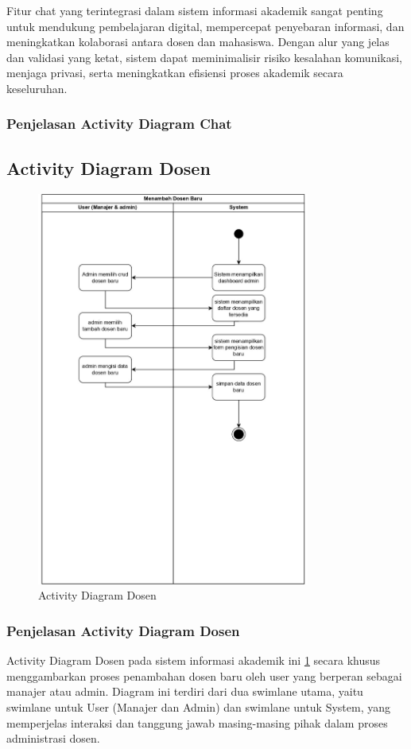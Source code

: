 \documentclass[a4paper,oneside,11pt]{book}
\begin{document}
Fitur chat yang terintegrasi dalam sistem informasi akademik sangat penting untuk mendukung pembelajaran digital, mempercepat penyebaran informasi, dan meningkatkan kolaborasi antara dosen dan mahasiswa. Dengan alur yang jelas dan validasi yang ketat, sistem dapat meminimalisir risiko kesalahan komunikasi, menjaga privasi, serta meningkatkan efisiensi proses akademik secara keseluruhan.

\subsubsection{Penjelasan Activity Diagram Chat}

\subsection{Activity Diagram Dosen}
\begin{figure}[H]
  \centering
  \includegraphics[width=0.8\textwidth]{Activity Diagram/Dosen.jpg}
  \caption{Activity Diagram Dosen}
  \label{fig:activity_dosen}
\end{figure}

\subsubsection{Penjelasan Activity Diagram Dosen}
Activity Diagram Dosen pada sistem informasi akademik ini \ref{fig:activity_dosen} secara khusus menggambarkan proses penambahan dosen baru oleh user yang berperan sebagai manajer atau admin. Diagram ini terdiri dari dua swimlane utama, yaitu swimlane untuk User (Manajer dan Admin) dan swimlane untuk System, yang memperjelas interaksi dan tanggung jawab masing-masing pihak dalam proses administrasi dosen.
\end{document}
